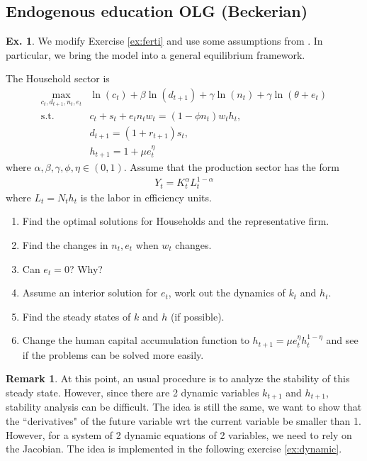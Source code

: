 \documentclass[11pt,a4paper]{book}
\theoremstyle{definition}\newtheorem{definition}{Definition}
\theoremstyle{definition}\newtheorem{fact}{Fact}
\theoremstyle{definition}\newtheorem{remark}{Remark}
\theoremstyle{definition}\newtheorem{ex}{Ex.}
\theoremstyle{definition}\newtheorem{project}{Project}
\theoremstyle{definition}\newtheorem{problem}{Problem}
\theoremstyle{definition}\newtheorem{example}{Example}
\numberwithin{theorem}{section}
\numberwithin{corollary}{chapter}
\numberwithin{assumption}{chapter}
\numberwithin{definition}{chapter}
\numberwithin{prop}{chapter}
\numberwithin{notation}{chapter}
\numberwithin{problem}{chapter}
\numberwithin{example}{chapter}
\numberwithin{fact}{chapter}
\numberwithin{ex}{chapter}
\begin{document}
	\subsection{Endogenous education OLG (Beckerian)}
	\begin{ex}
		We modify Exercise \ref{ex:ferti} and use some assumptions from \citet{hirazawa2017labor}. In particular, we bring the model into a general equilibrium framework.
		
	The Household sector is
	\begin{align*}
			\max_{c_t, d_{t+1}, n_t, e_t} & \ln(c_t) + \beta \ln (d_{t+1}) + \gamma \ln ( n_t) + \gamma \ln (\theta + e_t) \\
			\text{s.t.}\ & c_t + s_t + e_t n_t w_t = (1-\phi n_t) w_t h_t, \\
			& d_{t+1} = (1+r_{t+1}) s_t, \\
			& h_{t+1} = 1 + \mu e_t^\eta
		\end{align*}
	where $\alpha,\beta,\gamma,\phi,\eta \in (0,1)$.
	Assume that the production sector has the form
	\begin{align*}
		Y_t = K_t^\alpha L_t^{1-\alpha}
	\end{align*}
	where $L_t = N_t h_t$ is the labor in efficiency units.
	
	\begin{enumerate}
		\item Find the optimal solutions for Households and the representative firm.
		\item Find the changes in $n_t, e_t$ when $w_t$ changes. 
		\item Can $e_t = 0$? Why?
		\item Assume an interior solution for $e_t$, work out the dynamics of $k_t$ and $h_t$.
		\item Find the steady states of $k$ and $h$ (if possible).
		\item Change the human capital accumulation function to $h_{t+1} = \mu e_t^\eta h_t^{1-\eta}$ and see if the problems can be solved more easily.
	\end{enumerate}
	
	\begin{remark}
		At this point, an usual procedure is to analyze the stability of this steady state. However, since there are 2 dynamic variables $k_{t+1}$ and $h_{t+1}$, stability analysis can be difficult. The idea is still the same, we want to show that the ``derivatives" of the future variable wrt the current variable be smaller than 1. However, for a system of 2 dynamic equations of 2 variables, we need to rely on the Jacobian. The idea is implemented in the following exercise \ref{ex:dynamic}.
	\end{remark}
	\end{ex}
	
\end{document}
